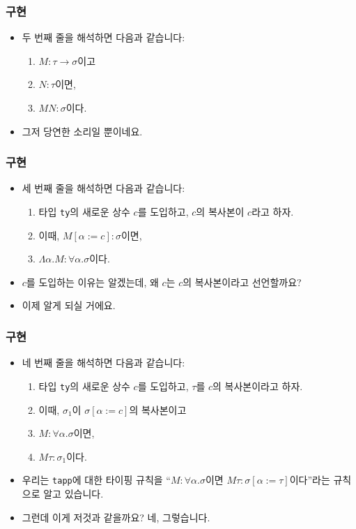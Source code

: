 \documentclass[slidestop,compress,mathserif]{beamer}
\begin{document}
    \begin{frame}
        \frametitle{구현}
        \begin{itemize}
            \item 두 번째 줄을 해석하면 다음과 같습니다:
            \begin{enumerate}
                \item $M : \tau \to \sigma$이고
                \item $N : \tau$이면,
                \item $M N : \sigma$이다.
            \end{enumerate}
            \item 그저 당연한 소리일 뿐이네요.
        \end{itemize}
    \end{frame}

    \begin{frame}
        \frametitle{구현}
        \begin{itemize}
            \item 세 번째 줄을 해석하면 다음과 같습니다:
            \begin{enumerate}
                \item 타입 \texttt{ty}의 새로운 상수 $c$를 도입하고, $c$의 복사본이 $c$라고 하자.
                \item 이때, $M \left[ \alpha := c \right] : \sigma$이면,
                \item $\Lambda \alpha . M : \forall \alpha . \sigma$이다.
            \end{enumerate}
            \item $c$를 도입하는 이유는 알겠는데, 왜 $c$는 $c$의 복사본이라고 선언할까요?
            \item 이제 알게 되실 거에요.
        \end{itemize}
    \end{frame}

    \begin{frame}
        \frametitle{구현}
        \begin{itemize}
            \item 네 번째 줄을 해석하면 다음과 같습니다:
            \begin{enumerate}
                \item 타입 \texttt{ty}의 새로운 상수 $c$를 도입하고, $\tau$를 $c$의 복사본이라고 하자.
                \item 이때, $\sigma_1$이 $\sigma \left[ \alpha := c \right]$의 복사본이고
                \item $M : \forall \alpha . \sigma$이면,
                \item $M \tau : \sigma_1$이다. 
            \end{enumerate}
            \item 우리는 \texttt{tapp}에 대한 타이핑 규칙을 ``$M : \forall \alpha . \sigma$이면 $M \tau : \sigma \left[ \alpha := \tau \right]$이다''라는 규칙으로 알고 있습니다.
            \item 그런데 이게 저것과 같을까요? 네, 그렇습니다.
        \end{itemize}
    \end{frame}
\end{document}
